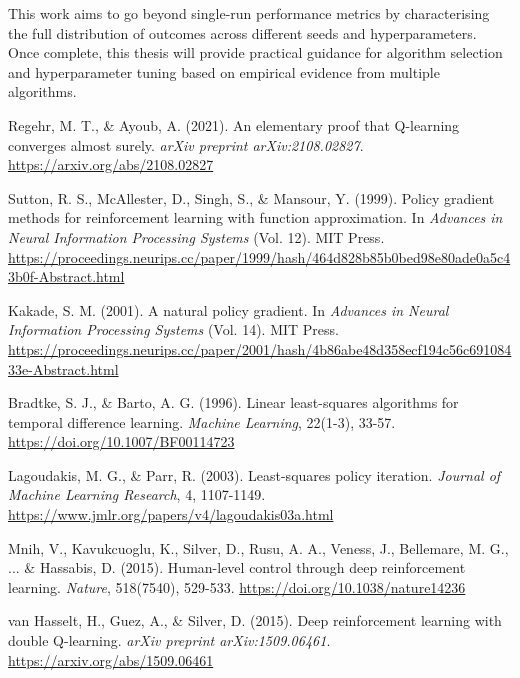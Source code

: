 \documentclass[12pt,a4paper]{report}
\begin{document}
This work aims to go beyond single-run performance metrics by characterising the full distribution of outcomes across different seeds and hyperparameters. Once complete, this thesis will provide practical guidance for algorithm selection and hyperparameter tuning based on empirical evidence from multiple algorithms.


\begin{thebibliography}{99}


Regehr, M. T., \& Ayoub, A. (2021).
An elementary proof that Q-learning converges almost surely.
\textit{arXiv preprint arXiv:2108.02827}.
\url{https://arxiv.org/abs/2108.02827}

Sutton, R. S., McAllester, D., Singh, S., \& Mansour, Y. (1999).
Policy gradient methods for reinforcement learning with function approximation.
In \textit{Advances in Neural Information Processing Systems} (Vol. 12). MIT Press.
\url{https://proceedings.neurips.cc/paper/1999/hash/464d828b85b0bed98e80ade0a5c43b0f-Abstract.html}

Kakade, S. M. (2001).
A natural policy gradient.
In \textit{Advances in Neural Information Processing Systems} (Vol. 14). MIT Press.
\url{https://proceedings.neurips.cc/paper/2001/hash/4b86abe48d358ecf194c56c69108433e-Abstract.html}

Bradtke, S. J., \& Barto, A. G. (1996).
Linear least-squares algorithms for temporal difference learning.
\textit{Machine Learning}, 22(1-3), 33-57.
\url{https://doi.org/10.1007/BF00114723}

Lagoudakis, M. G., \& Parr, R. (2003).
Least-squares policy iteration.
\textit{Journal of Machine Learning Research}, 4, 1107-1149.
\url{https://www.jmlr.org/papers/v4/lagoudakis03a.html}


Mnih, V., Kavukcuoglu, K., Silver, D., Rusu, A. A., Veness, J., Bellemare, M. G., ... \& Hassabis, D. (2015).
Human-level control through deep reinforcement learning.
\textit{Nature}, 518(7540), 529-533.
\url{https://doi.org/10.1038/nature14236}

van Hasselt, H., Guez, A., \& Silver, D. (2015).
Deep reinforcement learning with double Q-learning.
\textit{arXiv preprint arXiv:1509.06461}.
\url{https://arxiv.org/abs/1509.06461}


\end{thebibliography}
\end{document}
